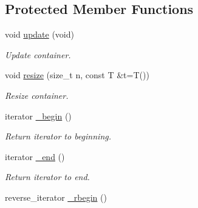 \subsection*{Protected Member Functions}
\begin{DoxyCompactItemize}
\item 
void \hyperlink{classmerlin_1_1set_a772e18b99eaea86f8a78f07cf6263238}{update} (void)\hypertarget{classmerlin_1_1set_a772e18b99eaea86f8a78f07cf6263238}{}\label{classmerlin_1_1set_a772e18b99eaea86f8a78f07cf6263238}

\begin{DoxyCompactList}\small\item\em Update container. \end{DoxyCompactList}\item 
void \hyperlink{classmerlin_1_1set_a9492b2fb9afeea31d559664bb9afcbb3}{resize} (size\+\_\+t n, const T \&t=T())\hypertarget{classmerlin_1_1set_a9492b2fb9afeea31d559664bb9afcbb3}{}\label{classmerlin_1_1set_a9492b2fb9afeea31d559664bb9afcbb3}

\begin{DoxyCompactList}\small\item\em Resize container. \end{DoxyCompactList}\item 
iterator \hyperlink{classmerlin_1_1set_adc4f7aeff8a337c7b3897b54616849cc}{\+\_\+begin} ()\hypertarget{classmerlin_1_1set_adc4f7aeff8a337c7b3897b54616849cc}{}\label{classmerlin_1_1set_adc4f7aeff8a337c7b3897b54616849cc}

\begin{DoxyCompactList}\small\item\em Return iterator to beginning. \end{DoxyCompactList}\item 
iterator \hyperlink{classmerlin_1_1set_ad87a431a0006ff8608b17515648c8d95}{\+\_\+end} ()\hypertarget{classmerlin_1_1set_ad87a431a0006ff8608b17515648c8d95}{}\label{classmerlin_1_1set_ad87a431a0006ff8608b17515648c8d95}

\begin{DoxyCompactList}\small\item\em Return iterator to end. \end{DoxyCompactList}\item 
reverse\+\_\+iterator \hyperlink{classmerlin_1_1set_ae77c35b12604b58b663e10f3b94799f0}{\+\_\+rbegin} ()\hypertarget{classmerlin_1_1set_ae77c35b12604b58b663e10f3b94799f0}{}\label{classmerlin_1_1set_ae77c35b12604b58b663e10f3b94799f0}


\end{DoxyCompactItemize}

